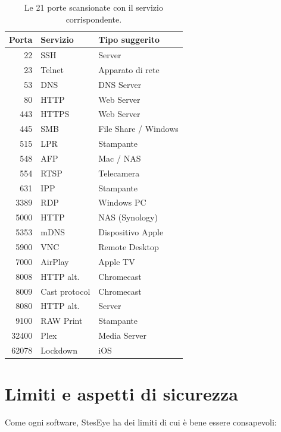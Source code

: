 \documentclass[a4paper,11pt]{article}
\begin{document}
\begin{table}[H]
\centering
\small
\begin{tabular}{rll}
  \toprule
  \textbf{Porta} & \textbf{Servizio}   & \textbf{Tipo suggerito} \\
  \midrule
  22    & SSH           & Server \\
  23    & Telnet        & Apparato di rete \\
  53    & DNS           & DNS Server \\
  80    & HTTP          & Web Server \\
  443   & HTTPS         & Web Server \\
  445   & SMB           & File Share / Windows \\
  515   & LPR           & Stampante \\
  548   & AFP           & Mac / NAS \\
  554   & RTSP          & Telecamera \\
  631   & IPP           & Stampante \\
  3389  & RDP           & Windows PC \\
  5000  & HTTP          & NAS (Synology) \\
  5353  & mDNS          & Dispositivo Apple \\
  5900  & VNC           & Remote Desktop \\
  7000  & AirPlay       & Apple TV \\
  8008  & HTTP alt.     & Chromecast \\
  8009  & Cast protocol & Chromecast \\
  8080  & HTTP alt.     & Server \\
  9100  & RAW Print     & Stampante \\
  32400 & Plex          & Media Server \\
  62078 & Lockdown      & iOS \\
  \bottomrule
\end{tabular}
\caption{Le 21 porte scansionate con il servizio corrispondente.}
\end{table}


\section{Limiti e aspetti di sicurezza}

Come ogni software, StesEye ha dei limiti di cui è bene essere
consapevoli:
\end{document}
